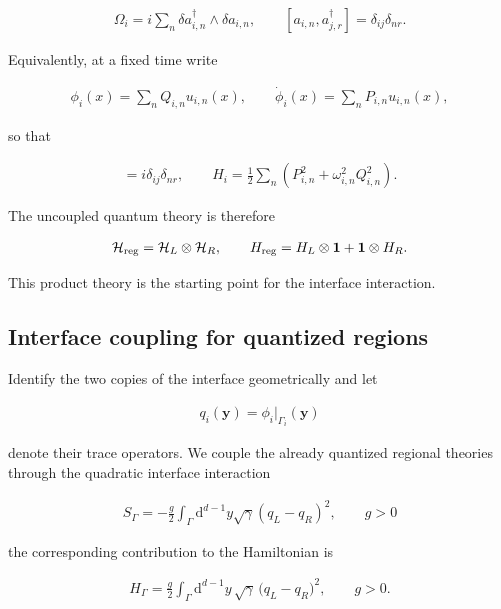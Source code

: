 \begin{align}
\Omega_i
=i\sum_n\delta a_{i,n}^\dagger\wedge\delta a_{i,n},
\qquad
[a_{i,n},a_{j,r}^\dagger]
=\delta_{ij}\delta_{nr}.
\end{align}

Equivalently, at a fixed time write

\begin{align}
\phi_i(x)=\sum_n Q_{i,n}u_{i,n}(x),
\qquad
\dot{\phi}_i(x)=\sum_n P_{i,n}u_{i,n}(x),
\end{align}

so that

\begin{align}
[Q_{i,n},P_{j,r}]=i\delta_{ij}\delta_{nr},
\qquad
H_i=\frac12\sum_n\left(P_{i,n}^2+\omega_{i,n}^2Q_{i,n}^2\right).
\end{align}

The uncoupled quantum theory is therefore

\begin{align}
\mathcal H_{\rm reg}
=\mathcal H_L\otimes\mathcal H_R,
\qquad
H_{\rm reg}=H_L\otimes\mathbf 1+\mathbf 1\otimes H_R.
\end{align}

This product theory is the starting point for the interface interaction.

\subsection{Interface coupling for quantized regions}\label{subsec:quantum-interface-coupling}

Identify the two copies of the interface geometrically and let

\begin{align}
q_i(\mathbf y)=\phi_i\big|_{\Gamma_i}(\mathbf y)
\end{align}

denote their trace operators. We couple the already quantized regional theories through the quadratic interface interaction

\begin{align}
S_\Gamma =-\frac{g}{2} \int_\Gamma \mathrm{d}^{d-1}y \sqrt{ \gamma }(q_L-q_R)^{2}, \qquad g>0
\end{align}

the corresponding contribution to the Hamiltonian is

\begin{align}
H_\Gamma
=\frac g2\int_\Gamma\mathrm d^{d-1}y\,\sqrt\gamma\,
\bigl(q_L-q_R\bigr)^2,
\qquad g>0.
\end{align}

